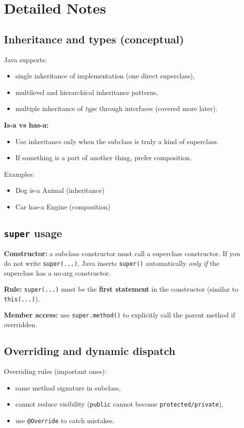 \documentclass[11pt]{article}
\begin{document}
\section{Detailed Notes}
\subsection{Inheritance and types (conceptual)}
Java supports:
\begin{itemize}
  \item single inheritance of implementation (one direct superclass),
  \item multilevel and hierarchical inheritance patterns,
  \item multiple inheritance of \emph{type} through interfaces (covered more later).
\end{itemize}

\textbf{Is-a vs has-a:}
\begin{itemize}
  \item Use inheritance only when the subclass is truly a kind of superclass.
  \item If something is a part of another thing, prefer composition.
\end{itemize}
Examples:
\begin{itemize}
  \item Dog is-a Animal (inheritance)
  \item Car has-a Engine (composition)
\end{itemize}

\subsection{\texttt{super} usage}
\textbf{Constructor:} a subclass constructor must call a superclass constructor.
If you do not write \texttt{super(...)}, Java inserts \texttt{super()} automatically \emph{only if} the superclass has a no-arg constructor.

\textbf{Rule:} \texttt{super(...)} must be the \textbf{first statement} in the constructor (similar to \texttt{this(...)}).

\textbf{Member access:} use \texttt{super.method()} to explicitly call the parent method if overridden.

\subsection{Overriding and dynamic dispatch}
Overriding rules (important ones):
\begin{itemize}
  \item same method signature in subclass,
  \item cannot reduce visibility (\texttt{public} cannot become \texttt{protected/private}),
  \item use \texttt{@Override} to catch mistakes.
\end{itemize}
\end{document}
